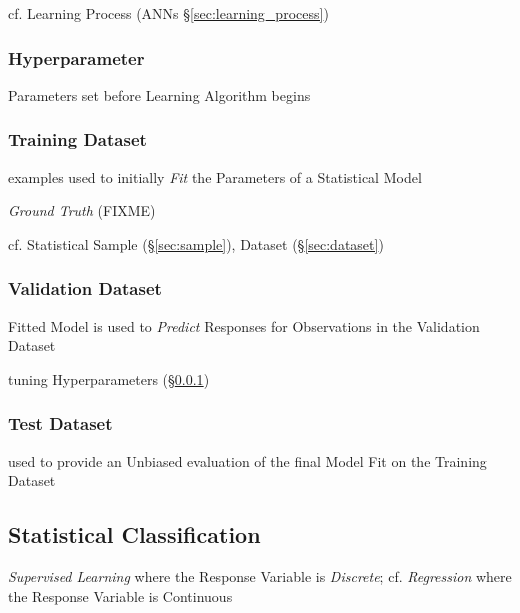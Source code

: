 \fist cf. Learning Process (ANNs \S\ref{sec:learning_process})



\subsubsection{Hyperparameter}\label{sec:hyperparameter}

Parameters set before Learning Algorithm begins



\subsubsection{Training Dataset}\label{sec:training_dataset}

examples used to initially \emph{Fit} the Parameters of a Statistical Model

\emph{Ground Truth} (FIXME)

cf. Statistical Sample (\S\ref{sec:sample}), Dataset (\S\ref{sec:dataset})



\subsubsection{Validation Dataset}\label{sec:validation_dataset}

Fitted Model is used to \emph{Predict} Responses for Observations in the
Validation Dataset

tuning Hyperparameters (\S\ref{sec:hyperparameter})



\subsubsection{Test Dataset}\label{sec:test_dataset}

used to provide an Unbiased evaluation of the final Model Fit on the Training
Dataset



\subsection{Statistical Classification}\label{sec:classification}

\emph{Supervised Learning} where the Response Variable is \emph{Discrete}; cf.
\emph{Regression} where the Response Variable is Continuous

